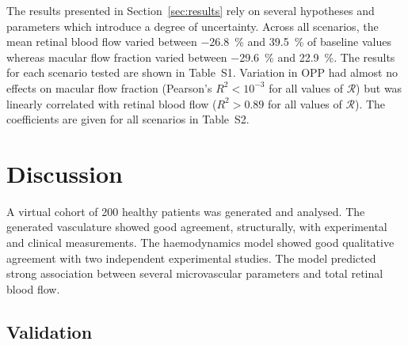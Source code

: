 \documentclass[11pt,]{article}
\begin{document}
The results presented in Section~\ref{sec:results} rely on several hypotheses and parameters which introduce a degree of uncertainty.
Across all scenarios, the mean retinal blood flow varied between \SI{-26.8}{\percent} and \SI{39.5}{\percent} of baseline values whereas macular flow fraction varied between \SI{-29.6}{\percent} and \SI{22.9}{\percent}.
The results for each scenario tested are shown in Table~S1.
Variation in OPP had almost no effects on macular flow fraction (Pearson's $R^2<10^{-3}$ for all values of $\mathcal R$) but was linearly correlated with retinal blood flow ($R^2>0.89$ for all values of $\mathcal R$).
The coefficients are given for all scenarios in Table~S2.

\section{Discussion}\label{sec:discussion}

A virtual cohort of 200 healthy patients was generated and analysed. 
The generated vasculature showed good agreement, structurally, with experimental and clinical measurements.
The haemodynamics model showed good qualitative agreement with two independent experimental studies.
The model predicted strong association between several microvascular parameters and total retinal blood flow.

\subsection{Validation}\label{sec:disc-validation}
\end{document}
